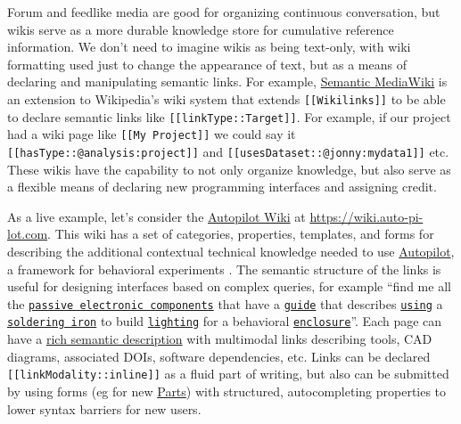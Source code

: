 \documentclass[10pt]{tufte-book}
\begin{document}
Forum and feedlike media are good for organizing continuous
conversation, but wikis serve as a more durable knowledge store for
cumulative reference information. We don't need to imagine wikis as
being text-only, with wiki formatting used just to change the appearance
of text, but as a means of declaring and manipulating semantic links.
For example,
\href{https://www.semantic-mediawiki.org/wiki/Semantic_MediaWiki}{Semantic
MediaWiki} is an extension to Wikipedia's wiki system that extends
\texttt{{[}{[}Wikilinks{]}{]}} to be able to declare semantic links like
\texttt{{[}{[}linkType::Target{]}{]}}. For example, if our project had a
wiki page like \texttt{{[}{[}My\ Project{]}{]}} we could say it
\texttt{{[}{[}hasType::@analysis:project{]}{]}} and
\texttt{{[}{[}usesDataset::@jonny:mydata1{]}{]}} etc. These wikis have
the capability to not only organize knowledge, but also serve as a
flexible means of declaring new programming interfaces and assigning
credit.

As a live example, let's consider the
\href{https://wiki.auto-pi-lot.com}{Autopilot Wiki} at
\url{https://wiki.auto-pi-lot.com}. This wiki has a set of categories,
properties, templates, and forms for describing the additional
contextual technical knowledge needed to use
\href{https://docs.auto-pi-lot.com/en/latest/}{Autopilot}, a framework
for behavioral experiments \citep{saundersAutopilotAutomatingBehavioral2019} . The semantic structure
of the links is useful for designing interfaces based on complex
queries, for example ``find me all the
\href{https://wiki.auto-pi-lot.com/index.php/Category:Passive_Component}{\texttt{passive\ electronic\ components}}
that have a
\href{https://wiki.auto-pi-lot.com/index.php/Category:Guide}{\texttt{guide}}
that describes
\href{https://wiki.auto-pi-lot.com/index.php/Property:Uses_Tool}{\texttt{using}}
a
\href{https://wiki.auto-pi-lot.com/index.php?title=Property\%3AUses+Tool\&limit=20\&offset=0\&filter=Soldering+Iron}{\texttt{soldering\ iron}}
to build
\href{https://wiki.auto-pi-lot.com/index.php?title=Property\%3AModality\&limit=20\&offset=0\&filter=Illumination}{\texttt{lighting}}
for a behavioral
\href{https://wiki.auto-pi-lot.com/index.php?title=Property\%3AModality\&limit=20\&offset=0\&filter=Enclosures}{\texttt{enclosure}}''.
Each page can have a
\href{https://wiki.auto-pi-lot.com/index.php/Autopilot_Behavior_Box\#tab-content-facts-list}{rich
semantic description} with multimodal links describing tools, CAD
diagrams, associated DOIs, software dependencies, etc. Links can be
declared \texttt{{[}{[}linkModality::inline{]}{]}} as a fluid part of
writing, but also can be submitted by using forms (eg for new
\href{https://wiki.auto-pi-lot.com/index.php/Form:Part}{Parts}) with
structured, autocompleting properties to lower syntax barriers for new
users.
\end{document}
